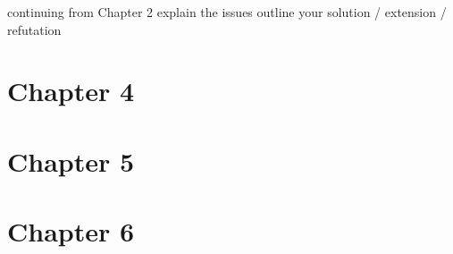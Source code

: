     continuing from Chapter 2 explain the issues
    outline your solution / extension / refutation
\fi

\section{Chapter 4}

\iffalse Implementation / Formalism (~15-30 pages)
    not every thesis has or needs an implementation
\fi

\section{Chapter 5}

\iffalse
Results and Evaluation (~15-30 pages)

    adequacy, efficiency, productiveness, effectiveness (choose your criteria, state them clearly and justify them)
    be careful that you are using a fair measure, and that you are actually measuring what you claim to be measuring
    if comparing with previous techniques those techniques must be described in Chapter 2
    be honest in evaluation
    admit weaknesses
\fi

\section{Chapter 6}
\iffalse
 Conclusions and Future Work (~5-10 pages)

    State what you've done and what you've found
    Summarize contributions (achievements and impact)
    Outline open issues/directions for future work
\fi
